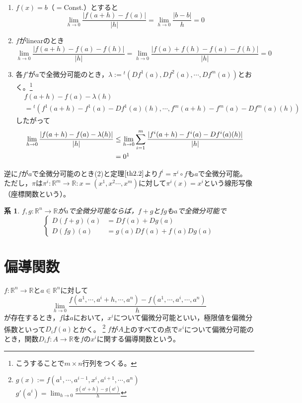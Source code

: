\documentclass[dvipdfmx,a4j,10pt]{jsarticle}
\makeatletter
\theoremstyle{mystyle1}
\newtheorem{cor}[dfn]{系}
\theoremstyle{mystyle2}
\renewenvironment{proof}[1][\proofname]{\par
  \pushQED{\qed}%
  \normalfont
  \topsep6\p@\@plus6\p@ \trivlist
  \item[\hskip\labelsep{\bfseries\sffamily #1}]\ignorespaces
}{%
  \popQED\endtrivlist\@endpefalse
}
\renewcommand\proofname{証明}
\makeatother
\begin{document}
\begin{proof}\
	\begin{enumerate}
		\item $f(x)=b$（$=$Const.）とすると
		\[
		\lim_{h\to 0}\frac{|f(a+h)-f(a)|}{|h|}=\lim_{h\to 0}\frac{|b-b|}{h}=0
		\]
		\item $f$がlinearのとき
		\[
		\lim_{h\to0}\frac{|f(a+h)-f(a)-f(h)|}{|h|}=\lim_{h\to0}\frac{|f(a)+f(h)-f(a)-f(h)|}{|h|}=0
		\]
		\item 各$f'$が$a$で全微分可能のとき，$\lambda:={}^{t}(Df^1(a),Df^2(a),\cdots,Df^m(a))$とおく。\footnote{こうすることで$m\times n$行列をつくる。}
		\[
		\begin{split}
		& f(a+h)-f(a)-\lambda(h)\\
		& = {}^{t}\left(f^1(a+h)-f^1(a)-Df^1(a)(h),\cdots,f^m(a+h)-f^m(a)-Df^m(a)(h)\right)
		\end{split}
		\]
		したがって
		\[
		\begin{split}
		\lim_{h\to0}\frac{|f(a+h)-f(a)-\lambda(h)|}{|h|} &\leq \lim_{h\to0}\sum_{i=1}^m\frac{|f^i(a+h)-f^i(a)-Df^i(a)(h)|}{|h|}\\
		&=0\footnotemark
		\end{split}
		\]
	\end{enumerate}
\end{proof}
逆に$f$が$a$で全微分可能のとき(2)と定理$\ref{th2.2}$より$f^i=\pi^i\circ f$も$a$で全微分可能。\\
ただし，$\pi$は$\pi^i:\mathbb{R}^m\to\mathbb{R}:$$x=(x^1,x^2\cdots,x^m)$に対して$\pi^i(x)=x^i$という線形写像（座標関数という）。

\begin{framed}
	\begin{cor}
		$f,g:\mathbb{R}^n\to\mathbb{R}$が$a$で全微分可能ならば，$f+g$と$fg$も$a$で全微分可能で
		\[
		\begin{cases}
			D(f+g)(a) &= Df(a)+Dg(a)\\
			D(fg)(a) &= g(a)Df(a)+f(a)Dg(a)
		\end{cases}
		\]
	\end{cor}
\end{framed}


\newpage


\section{偏導関数}
$f:\mathbb{R}^n\to\mathbb{R}$と$a\in\mathbb{R}^n$に対して
\[
\lim_{h\to0}\frac{f(a^1,\cdots,a^i+h,\cdots,a^n)-f(a^1,\cdots,a^i,\cdots,a^n)}{h}
\]
が存在するとき，$f$は$a$において，$x^i$について偏微分可能といい，極限値を偏微分係数といって$D_if(a)$とかく。
\footnote{
$g(x):=f(a^1,\cdots,a^{i-1},x^i,a^{i+1},\cdots,a^n)$\\
$g'(a^i)=\lim_{h\to0}\frac{g(a^i+h)-g(a^i)}{h}$
}
$f$が$A$上のすべての点で$x^i$について偏微分可能のとき，関数$D_if:A\to\mathbb{R}$を$f$の$x^i$に関する偏導関数という。
\end{document}
